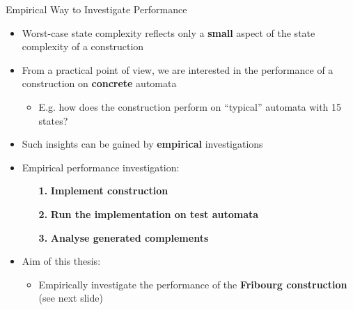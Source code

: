 \documentclass[12pt]{beamer}
\newcommand{\fat}[1]{\textbf{#1}}
\begin{document}
\begin{frame}{Empirical Way to Investigate Performance}
\begin{itemize}
\item Worst-case state complexity reflects only a \fat{small} aspect of the state complexity of a construction
\pause
\item From a practical point of view, we are interested in the performance of a construction on \fat{concrete} automata
  \begin{itemize}
  \item E.g. how does the construction perform on ``typical'' automata with 15 states?
  \end{itemize}
\pause
\item Such insights can be gained by \fat{empirical} investigations
\item Empirical performance investigation:
  \begin{enumerate}
  \item[\fat{1.}] \fat{Implement construction}
  \item[\fat{2.}] \fat{Run the implementation on test automata}
  \item[\fat{3.}] \fat{Analyse generated complements}
  \end{enumerate}
\pause
\item Aim of this thesis:
  \begin{itemize}
  \item Empirically investigate the performance of the \fat{Fribourg construction} (see next slide)
  \end{itemize}
\end{itemize}
\end{frame}
\end{document}
